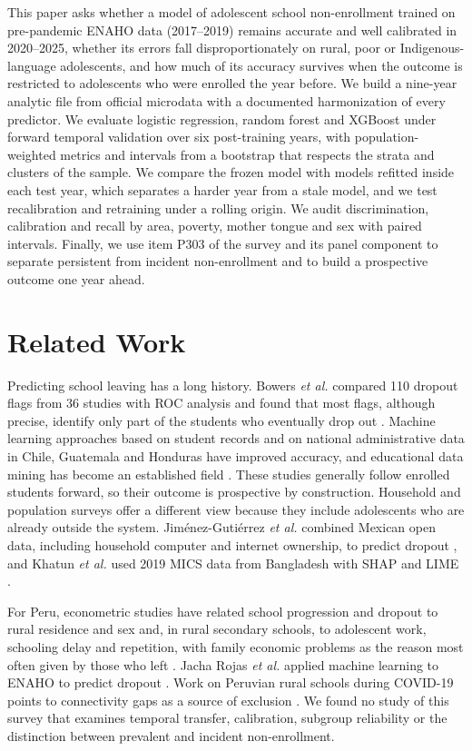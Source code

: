 \documentclass[conference]{IEEEtran}
\begin{document}
This paper asks whether a model of adolescent school non-enrollment trained on pre-pandemic ENAHO data (2017--2019) remains accurate and well calibrated in 2020--2025, whether its errors fall disproportionately on rural, poor or Indigenous-language adolescents, and how much of its accuracy survives when the outcome is restricted to adolescents who were enrolled the year before. We build a nine-year analytic file from official microdata with a documented harmonization of every predictor. We evaluate logistic regression, random forest and XGBoost under forward temporal validation over six post-training years, with population-weighted metrics and intervals from a bootstrap that respects the strata and clusters of the sample. We compare the frozen model with models refitted inside each test year, which separates a harder year from a stale model, and we test recalibration and retraining under a rolling origin. We audit discrimination, calibration and recall by area, poverty, mother tongue and sex with paired intervals. Finally, we use item P303 of the survey and its panel component to separate persistent from incident non-enrollment and to build a prospective outcome one year ahead.

\section{Related Work}

Predicting school leaving has a long history. Bowers \textit{et al.} compared 110 dropout flags from 36 studies with ROC analysis and found that most flags, although precise, identify only part of the students who eventually drop out \cite{bowers2013}. Machine learning approaches based on student records \cite{lakkaraju2015,sansone2019} and on national administrative data in Chile, Guatemala and Honduras \cite{rodriguez2023,adelman2018} have improved accuracy, and educational data mining has become an established field \cite{romero2020}. These studies generally follow enrolled students forward, so their outcome is prospective by construction. Household and population surveys offer a different view because they include adolescents who are already outside the system. Jim\'enez-Guti\'errez \textit{et al.} combined Mexican open data, including household computer and internet ownership, to predict dropout \cite{jimenez2024}, and Khatun \textit{et al.} used 2019 MICS data from Bangladesh with SHAP and LIME \cite{khatun2025}.

For Peru, econometric studies have related school progression and dropout to rural residence and sex \cite{cavero2011} and, in rural secondary schools, to adolescent work, schooling delay and repetition, with family economic problems as the reason most often given by those who left \cite{alcazar2009}. Jacha Rojas \textit{et al.} applied machine learning to ENAHO to predict dropout \cite{jacha2024}. Work on Peruvian rural schools during COVID-19 points to connectivity gaps as a source of exclusion \cite{anaya2021}. We found no study of this survey that examines temporal transfer, calibration, subgroup reliability or the distinction between prevalent and incident non-enrollment.
\end{document}
